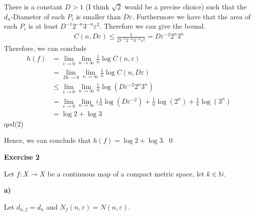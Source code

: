 \documentclass{article}
\newcommand{\N}{\mathbb{N}}
\newcommand{\subqed}[1]{\hfill\textsf{qed}({#1})}
\newcommand{\aufgabe}[1]{
{
	\vspace*{0.5cm}
	\noindent\textsf{\textbf{Exercise #1}}
	\vspace*{0.2cm}

}
}
\newcommand{\teilaufgabe}[1]{
{       

	\noindent\hspace*{0,1 cm}\textbf{#1)}
}
}
\theoremstyle{definition}
\theoremstyle{plain}
\theoremstyle{remark}
\begin{document}
There is a constant $D>1$ (I think $\sqrt2$ would be a precise choice) such that the $d_n$-Diameter of each $P_i$ is smaller than $D\varepsilon$.
Furthermore we have that the area of each $P_i$ is at least $D^{-1}2^{-n}3^{-n}\varepsilon^2$.
Therefore we can give the bound.
\begin{align}
	C(n,D\varepsilon)\leq \frac{1}{D^{-1}2^{-n}3^{-n}\varepsilon^2} = D\varepsilon^{-2}2^n3^n
\end{align}
Therefore, we can conclude
\begin{align}
	h(f)&=\lim_{\epsilon\to 0}\lim_{n\to\infty}\frac{1}{n}\log C(n,\varepsilon) \\
	    &=\lim_{D\epsilon\to 0}\lim_{n\to\infty}\frac{1}{n}\log C(n,D\varepsilon)\\
	    &\leq\lim_{\epsilon\to 0}\lim_{n\to\infty}\frac{1}{n}\log (D\varepsilon^{-2}2^n3^n) \\
	    &=\lim_{\epsilon\to 0}\lim_{n\to\infty}(\frac{1}{n}\log (D\varepsilon^{-2})+\frac{1}{n}\log(2^n)+\frac{1}{n}\log(3^n) \\
	    &= \log2 + \log 3
\end{align}
\subqed2

Hence, we can conclude that $h(f)=\log2+\log3$. \qed

\aufgabe2
Let $f:X\to X$ be a continuous map of a compact metric space, let $k\in\N$. 
\teilaufgabe{a}
Let $d_{n,f}=d_n$ and $N_f(n,\varepsilon)=N(n,\varepsilon)$.
\end{document}
